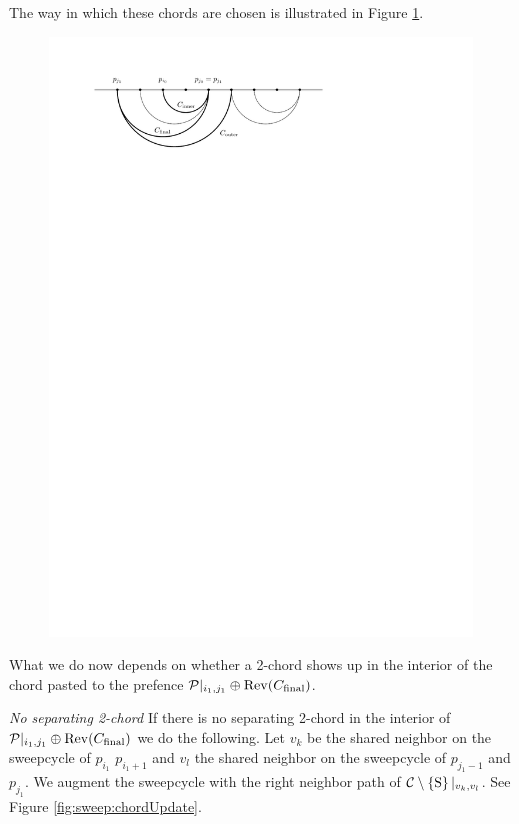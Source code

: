     The way in which these chords are chosen is illustrated in Figure \ref{fig:sweep:chordsOnPrefence}.

    \begin{figure}[h]
      \centering
      \includegraphics[scale=1]{unifiedalgo/img/chordsOnPrefence}
      \caption{}
      \label{fig:sweep:chordsOnPrefence}
    \end{figure}

    What we do now depends on whether a 2-chord shows up in the interior of the chord pasted to the prefence $\mathcal{P}|_{i_1, j_1} \oplus \operatorname{Rev}({C_\text{final}})$.


    \emph{No separating 2-chord}
    If there is no separating 2-chord in the interior of $\mathcal{P}|_{i_1, j_1} \oplus \operatorname{Rev}({C_\text{final}})$ we do the following. Let $v_k$ be the shared neighbor on the sweepcycle of $p_{i_1}$ $p_{i_1 +1}$ and $v_l$ the shared neighbor on the sweepcycle  of $p_{j_1 -1}$ and $p_{j_1}$. We augment the sweepcycle with the right neighbor path of $\mathcal{C} \setminus \left\lbrace {\mathrm{S}} \right\rbrace|_{v_k, v_l}$. See Figure \ref{fig:sweep:chordUpdate}.

